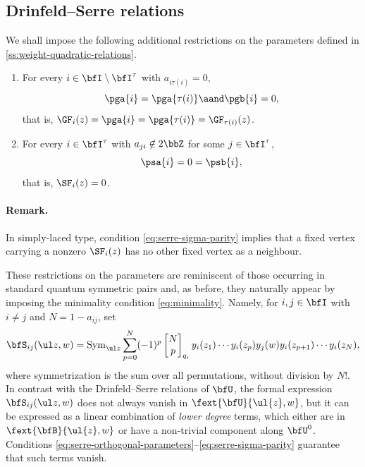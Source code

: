 \documentclass[reqno]{amsart}
\numberwithin{equation}{section}
\newenvironment{remark}{\medskip\paragraph{{\bf Remark.}}}{\par\medskip}
\begin{document}
\subsection{Drinfeld--Serre relations}
\label{ss:DS-simply-laced}
We shall impose the following additional restrictions on the parameters defined in \ref{ss:weight-quadratic-relations}.
\begin{enumerate}[leftmargin=2em]\itemsep0.25cm
\item For every $i\in\bfI\setminus\bfI^\tau$ with $a_{i\tau(i)}=0$,
\begin{equation}\label{eq:serre-orthogonal-parameters}
\pga{i}=\pga{\tau(i)}\aand \pgb{i}=0,
\end{equation}
that is, $\GF_i(z)=\pga{i}=\pga{\tau(i)}=\GF_{\tau(i)}(z)$.
\item 
For every $i\in\bfI^\tau$ with $a_{ji}\not\in 2\bbZ$ for some $j\in\bfI^\tau$,
\begin{equation}\label{eq:serre-sigma-parity}
\psa{i}=0=\psb{i},
\end{equation}
that is, $\SF_i(z)=0$.
\end{enumerate}

\begin{remark}
In simply-laced type, condition \eqref{eq:serre-sigma-parity} implies that a fixed vertex
carrying a nonzero $\SF_i(z)$ has no other fixed vertex as a neighbour.\hfill\rmkend
\end{remark}

These restrictions on the parameters are reminiscent of those occurring in standard quantum symmetric pairs \cite{regelskis-vlaar-20, appel-vlaar-22} and, as before, they naturally appear by imposing the minimality condition \eqref{eq:minimality}. 
Namely, for 
$i,j\in\bfI$ with $i\neq j$ and $N=1-a_{ij}$, set
\begin{equation}\label{eq:serre-expression}
\bfS_{ij}(\ul z,w)=\operatorname{Sym}_{\ul z}
\sum_{p=0}^{N}(-1)^p\begin{bmatrix}N\\p\end{bmatrix}_{q_i}
y_i(z_1)\cdots y_i(z_p)y_j(w)y_i(z_{p+1})\cdots y_i(z_N),
\end{equation}
where symmetrization is the sum over all permutations, without
division by $N!$. In contrast with the Drinfeld--Serre relations of $\bfU$, 
the formal expression $\bfS_{ij}(\ul z,w)$ does not always vanish
in $\fext{\bfU}{\ul{z},w}$, but it can be expressed as a linear combination of \emph{lower degree} terms, which either are in $\fext{\bfB}{\ul{z},w}$ or have a non-trivial component along $\bfU^0$. Conditions \eqref{eq:serre-orthogonal-parameters}--\eqref{eq:serre-sigma-parity} guarantee that such terms vanish.
\end{document}

